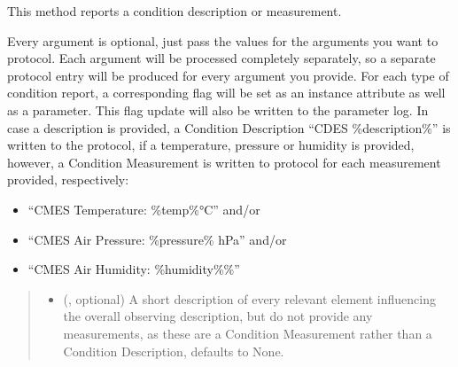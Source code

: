 \documentclass[letterpaper,10pt,english]{sphinxmanual}
\begin{document}
\begin{fulllineitems}
\begin{fulllineitems}
\label{\detokenize{autoapi/aop/aop/index:aop.aop.Session.condition_report}}
\pysigstartsignatures
{}
\pysigstopsignatures
\sphinxAtStartPar
This method reports a condition description or measurement.

\sphinxAtStartPar
Every argument is optional, just pass the values for the arguments you
want to protocol. Each argument will be processed completely
separately, so a separate protocol entry will be produced for every
argument you provide. For each type of condition report, a
corresponding flag will be set as an instance attribute as well as a
parameter. This flag update will also be written to the parameter log.
In case a description is provided, a Condition Description “CDES
\%description\%” is written to the protocol, if a temperature, pressure
or humidity is provided, however, a Condition Measurement is written to
protocol for each measurement provided, respectively:
\begin{itemize}
\item {} 
\sphinxAtStartPar
“CMES Temperature: \%temp\%°C” and/or

\item {} 
\sphinxAtStartPar
“CMES Air Pressure: \%pressure\% hPa” and/or

\item {} 
\sphinxAtStartPar
“CMES Air Humidity: \%humidity\%\%”

\end{itemize}
\begin{quote}\begin{description}
\begin{itemize}
\item {} 
\sphinxAtStartPar
{} (, optional) \textendash{} A short description of every relevant element influencing the
overall observing description, but do not provide any measurements,
as these are a Condition Measurement rather than a Condition
Description, defaults to None.


\end{itemize}
\end{description}
\end{quote}
\end{fulllineitems}
\end{fulllineitems}
\end{document}
